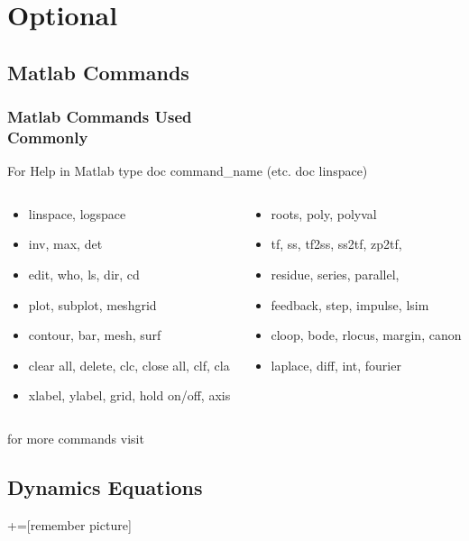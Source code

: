\documentclass[hyperref={pdfpagelabels=true}]{beamer}
\begin{document}
\section{Optional}

\subsection{Matlab Commands}
\begin{frame}
\frametitle{Matlab Commands Used \\ Commonly}
For Help in Matlab type doc command\_name (etc.  doc linspace)
\begin{columns}
    \begin{column}{0.5\textwidth}
\begin{itemize}
\item linspace, logspace
\item inv, max, det
\item edit, who, ls, dir, cd
\item plot, subplot, meshgrid
\item contour, bar,  mesh, surf
\item clear all, delete, clc, close all, clf, cla
\item xlabel, ylabel, grid, hold on/off, axis
\end{itemize}
\end{column}
 \begin{column}{0.5\textwidth}
\begin{itemize}
\item roots, poly, polyval
\item tf, ss, tf2ss, ss2tf, zp2tf,
\item residue, series, parallel,
\item feedback, step, impulse, lsim
\item cloop, bode, rlocus, margin, canon
\item laplace, diff, int, fourier
\end{itemize}
\end{column}
\end{columns}
\noindent\makebox[\linewidth]{\rule{10 cm}{0.1pt}}
{\tiny for more commands visit}
\href{http://instruct.uwo.ca/engin-sc/391b/CTM/extras/commands.html}{}
\end{frame}

\subsection{Dynamics Equations}
+=[remember picture]
\end{document}
